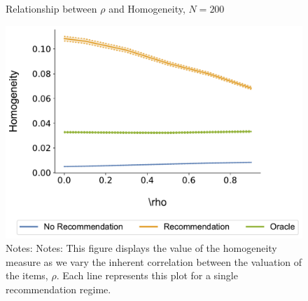 \documentclass[format=acmsmall, review=true]{acmart}
\begin{document}
\addtocounter{figure}{-1}

\begin{figure}[ht]
\caption{Relationship between $\rho$ and Homogeneity, $N = 200$}
\includegraphics[width=.45\linewidth]{figures/rho_homogeneity_N_200_T_20}
\caption*{\scriptsize Notes: Notes: This figure displays the value of the homogeneity measure as we vary the inherent correlation between the valuation of the items, $\rho$. Each line represents this plot for a single recommendation regime.}\label{fig:cor_homo}
\end{figure}
\end{document}
